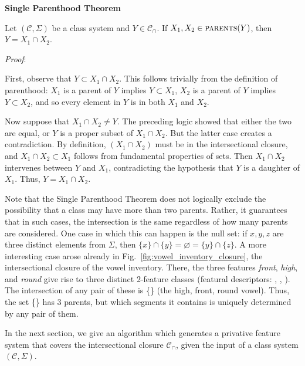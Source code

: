 \documentclass[11pt, oneside]{article}   	%
\begin{document}
\vspace{\baselineskip} \noindent \textbf{Single Parenthood Theorem}

Let $(\mathcal C, \Sigma)$ be a class system and $Y \in \mathcal C_\cap$. If $X_1, X_2 \in \textsc{parents}(Y)$, then $Y = X_1 \cap X_2$.

\vspace{\baselineskip} \noindent \textit{Proof}:

First, observe that $Y \subset X_1 \cap X_2$. This follows trivially from the definition of parenthood: $X_1$ is a parent of $Y$ implies $Y \subset X_1$, $X_2$ is a parent of $Y$ implies $Y \subset X_2$, and so every element in $Y$ is in both $X_1$ and $X_2$.

Now suppose that $X_1 \cap X_2 \neq Y$. The preceding logic showed that either the two are equal, or $Y$ is a proper subset of $X_1 \cap X_2$. But the latter case creates a contradiction. By definition, $(X_1 \cap X_2)$ must be in the intersectional closure, and $X_1 \cap X_2 \subset X_1$ follows from fundamental properties of sets. Then $X_1 \cap X_2$ intervenes between $Y$ and $X_1$, contradicting the hypothesis that $Y$ is a daughter of $X_1$. Thus, $Y = X_1 \cap X_2$.
	
\vspace{\baselineskip} Note that the Single Parenthood Theorem does not logically exclude the possibility that a class may have more than two parents. Rather, it guarantees that in such cases, the intersection is the same regardless of how many parents are considered. One case in which this can happen is the null set: if $x, y, z$ are three distinct elements from $\Sigma$, then $\{ x \} \cap \{ y \} = \varnothing = \{ y \} \cap \{ z \}$. A more interesting case arose already in Fig.~\ref{fig:vowel_inventory_closure}, the intersectional closure of the vowel inventory. There, the three features \textit{front}, \textit{high}, and \textit{round} give rise to three distinct 2-feature classes (featural descriptors: , , ). The intersection of any pair of these is \{\} (the high, front, round vowel). Thus, the set  \{\} has 3 parents, but which segments it contains is uniquely determined by any pair of them.

In the next section, we give an algorithm which generates a privative feature system that covers the intersectional closure $\mathcal C_\cap$, given the input of a class system $(\mathcal C, \Sigma)$.
\end{document}
